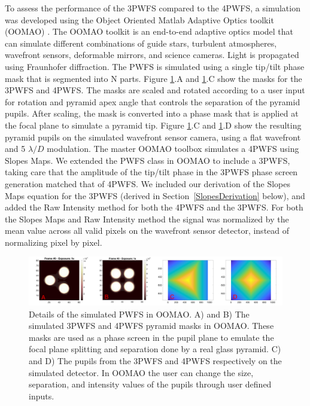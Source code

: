 To assess the performance of the 3PWFS compared to the 4PWFS, a simulation was developed using the Object Oriented Matlab Adaptive Optics toolkit (OOMAO) \cite{OOMAO}. The OOMAO toolkit is an end-to-end adaptive optics model that can simulate different combinations of guide stars, turbulent atmospheres, wavefront sensors, deformable mirrors, and science cameras. Light is propagated using Fraunhofer diffraction. The PWFS is simulated using a single tip/tilt phase mask that is segmented into N parts. Figure \ref{fig:oomaoFigs}.A and \ref{fig:oomaoFigs}.C show the masks for the 3PWFS and 4PWFS. The masks are scaled and rotated according to a user input for rotation and pyramid apex angle that controls the separation of the pyramid pupils. After scaling, the mask is converted into a phase mask that is applied at the focal plane to simulate a pyramid tip. Figure \ref{fig:oomaoFigs}.C and \ref{fig:oomaoFigs}.D show the resulting pyramid pupils on the simulated wavefront sensor camera, using a flat wavefront and 5 $\lambda/D$ modulation. The master OOMAO toolbox simulates a 4PWFS using Slopes Maps. We extended the PWFS class in OOMAO to include a 3PWFS, taking care that the amplitude of the tip/tilt phase in the 3PWFS phase screen generation matched that of 4PWFS. We included our derivation of the Slopes Maps equation for the 3PWFS (derived in Section~\ref{SlopesDerivation} below), and added the Raw Intensity method for both the 4PWFS and the 3PWFS. For both the Slopes Maps and Raw Intensity method the signal was normalized by the mean value across all valid pixels on the wavefront sensor detector, instead of normalizing pixel by pixel. 

\begin{figure}
    \centering
    \includegraphics[width=1\textwidth]{Chapter Materials/Chapter Two Materials/oomaoFigs.png}
    \caption{Details of the simulated PWFS in OOMAO. A) and B) The simulated 3PWFS and 4PWFS pyramid masks in OOMAO. These masks are used as a phase screen in the pupil plane to emulate the focal plane splitting and separation done by a real glass pyramid. C) and D) The pupils from the 3PWFS and 4PWFS respectively on the simulated detector. In OOMAO the user can change the size, separation, and intensity values of the pupils through user defined inputs.}
    \label{fig:oomaoFigs}
\end{figure}


